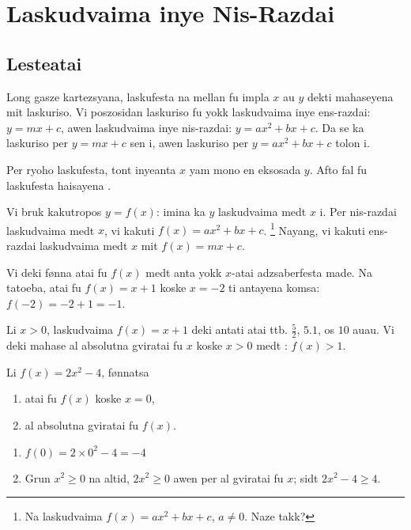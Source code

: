 \chapter{Laskudvaima inye Nis-Razdai}

\section{Lesteatai}

Long gasze kartezsyana, laskufesta na mellan fu impla \(x\) au \(y\) dekti mahaseyena mit laskuriso.
Vi poszosidan laskuriso fu yokk laskudvaima inye ens-razdai: \(y = mx + c\), awen laskudvaima inye
nis-razdai: \(y = ax^2 + bx + c\). Da se ka laskuriso per \(y = mx + c\) sen i, awen laskuriso per
\(y = ax^2 + bx + c\) tolon i.

Per ryoho laskufesta, tont inyeanta \(x\) yam mono en eksosada \(y\).
Afto fal fu laskufesta haisayena .

Vi bruk kakutropos \(y = f\left(x\right)\): imina ka \(y\) laskudvaima medt \(x\) i.
Per nis-razdai laskudvaima medt \(x\), vi kakuti
\(f\left(x\right) = ax^2 + bx + c\). \footnote{Na  laskudvaima \(f\left(x\right)=ax^2+bx+c\), \(a\neq0\). Naze takk?}
Nayang, vi kakuti ens-razdai laskudvaima medt \(x\) mit \(f\left(x\right) = mx + c\).

Vi deki fønna atai fu \(f\left(x\right)\) medt anta yokk \(x\)-atai adzsaberfesta made.
Na tatoeba, atai fu \(f\left(x\right) = x + 1\) koske \(x = -2\) ti antayena komsa: \(f\left(-2\right)=-2+1=-1\).

Li \(x > 0\), laskudvaima \(f\left(x\right) = x + 1\) deki antati atai ttb. \(\frac{5}{2}\), \(5.1\), os \(10\) auau.
Vi deki mahase al absolutna gviratai fu \(x\) koske \(x > 0\) medt : \(f\left(x\right) > 1\).

\begin{tatoeba}
  Li \(f\left(x\right)=2x^2-4\), fønnatsa
  \begin{enumerate}
    \item atai fu \(f\left(x\right)\) koske \(x=0\),
    \item al absolutna gviratai fu \(f\left(x\right)\).
  \end{enumerate}

  \tcblower

  \begin{enumerate}
    \item \(f\left(0\right) = 2\times0^2 - 4 = -4\)
    \item Grun \(x^2\geq0\) na altid, \(2x^2\geq0\) awen per al gviratai fu \(x\); sidt \(2x^2-4\geq4\).
  \end{enumerate}
\end{tatoeba}

